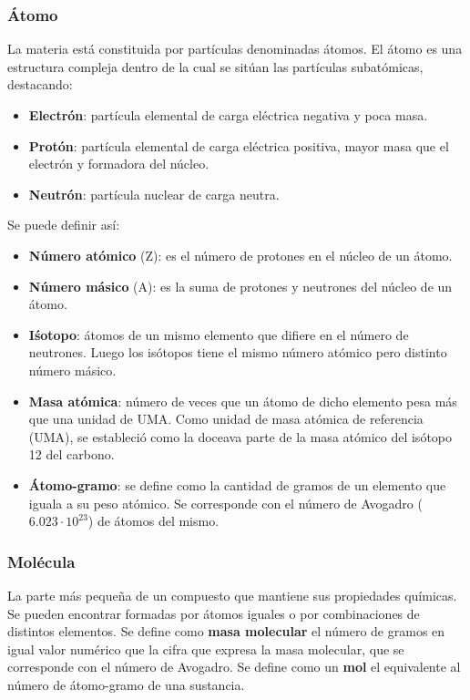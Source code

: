 \subsubsection{Átomo}
La materia está constituida por partículas denominadas átomos. El átomo es una estructura compleja dentro de la cual se sitúan las partículas subatómicas, destacando:
\begin{itemize}[itemsep=0pt,parsep=0pt,topsep=0pt,partopsep=0pt]
    \item \textbf{Electrón}: partícula elemental de carga eléctrica negativa y poca masa.
    \item\textbf{Protón}: partícula elemental de carga eléctrica positiva, mayor masa que el electrón y formadora del núcleo.
    \item\textbf{Neutrón}: partícula nuclear de carga neutra.
\end{itemize}
Se puede definir así:
\begin{itemize}[itemsep=0pt,parsep=0pt,topsep=0pt,partopsep=0pt]
    \item \textbf{Número atómico} (Z): es el número de protones en el núcleo de un átomo.
    \item\textbf{Número másico} (A): es la suma de protones y neutrones del núcleo de un átomo.
    \item\textbf{Iśotopo}: átomos de un mismo elemento que difiere en el número de neutrones. Luego los isótopos tiene el mismo número atómico pero distinto número másico.
    \item\textbf{Masa atómica}: número de veces que un átomo de dicho elemento pesa más que una unidad de UMA. Como unidad de masa atómica de referencia (UMA), se estableció como la doceava parte de la masa atómico del isótopo 12 del carbono.
    \item\textbf{Átomo-gramo}: se define como la cantidad de gramos de un elemento que iguala a su peso atómico. Se corresponde con el número de Avogadro ($6.023\cdot 10^{23}$) de átomos del mismo.
\end{itemize}
\subsubsection{Molécula}
La parte más pequeña de un compuesto que mantiene sus propiedades químicas. Se pueden encontrar formadas por átomos iguales o por combinaciones de distintos elementos. Se define como \textbf{masa molecular} el número de gramos en igual valor numérico que la cifra que expresa la masa molecular, que se corresponde con el número de Avogadro. Se define como un \textbf{mol} el equivalente al número de átomo-gramo de una sustancia.
